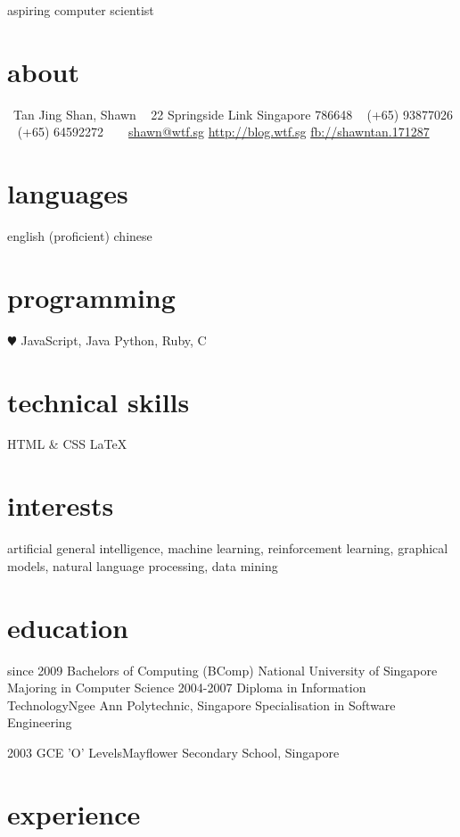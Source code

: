 \documentclass[]{friggeri-cv}
\begin{document}
{aspiring computer scientist}


\begin{aside}
	\section{about}
	\Male~Tan Jing Shan, Shawn
	\Letter~ 22 Springside Link
	Singapore 786648
	\Mobilefone~ (+65) 93877026
	\Telefon~ (+65) 64592272
	~
	\Email~ \href{mailto:shawn@wtf.sg}{shawn@wtf.sg}
	\href{http://blog.wtf.sg}{http://blog.wtf.sg}
	\href{http://facebook.com/shawntan.171287}{fb://shawntan.171287}
	\section{languages}
	english (proficient)
	chinese
	\section{programming}
	{\color{red} $\varheartsuit$} JavaScript, Java
	Python, Ruby, C
	\section{technical skills}
	HTML \& CSS
	\LaTeX
\end{aside}

\section{interests}

artificial general intelligence, machine learning, reinforcement learning, graphical models, natural language processing, data mining

\section{education}

\begin{entrylist}
	\entry
	{since 2009}
	{Bachelors of Computing (BComp)}
	{National University of Singapore}
	{Majoring in Computer Science}
	\entry
	{2004-2007}
	{Diploma in Information Technology}{Ngee Ann Polytechnic, Singapore}
	{Specialisation in Software Engineering}

	\entry
	{2003}
	{GCE 'O' Levels}{Mayflower Secondary School, Singapore}
	{}
\end{entrylist}

\section{experience}
\end{document}
